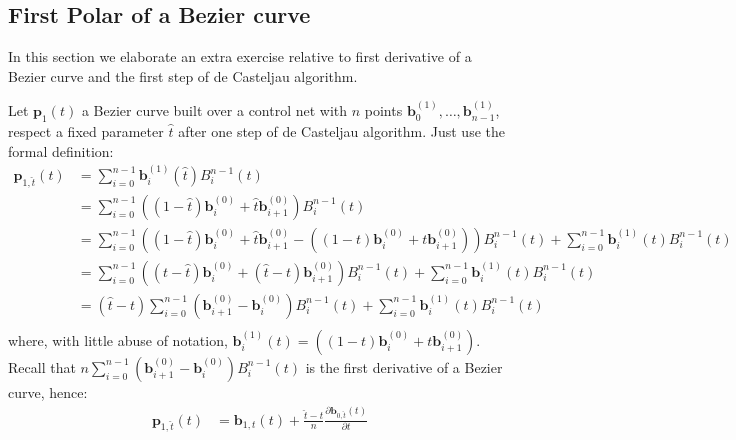 \documentclass{article}
\begin{document}
\newpage

\subsection{First Polar of a Bezier curve}

In this section we elaborate an extra exercise relative to first derivative
of a Bezier curve and the first step of de Casteljau algorithm.

Let $\mathbf{p}_{1}(t)$ a Bezier curve built over a control net with $n$ points
$\mathbf{b}_{0}^{(1)},\ldots,\mathbf{b}_{n-1}^{(1)}$, respect a fixed parameter $\hat{t}$
after one step of de Casteljau algorithm. Just use the formal definition:
\begin{displaymath}
    \begin{split}
        \mathbf{p}_{1,\hat{t}}(t)  &= \sum_{i=0}^{n-1}{\mathbf{b}_{i}^{(1)}(\hat{t})B_{i}^{n-1}(t)} \\
            &=  \sum_{i=0}^{n-1}{\left( (1-\hat{t})\mathbf{b}_{i}^{(0)} +
                \hat{t}\mathbf{b}_{i+1}^{(0)}\right)B_{i}^{n-1}(t)} \\
            &=  \sum_{i=0}^{n-1}{\left( (1-\hat{t})\mathbf{b}_{i}^{(0)} +
                \hat{t}\mathbf{b}_{i+1}^{(0)} -\left( (1-t)\mathbf{b}_{i}^{(0)} +
                t\mathbf{b}_{i+1}^{(0)}\right)\right)B_{i}^{n-1}(t)} +
                \sum_{i=0}^{n-1}{\mathbf{b}_{i}^{(1)}(t)B_{i}^{n-1}(t)} \\
            &=  \sum_{i=0}^{n-1}{\left( (t-\hat{t})\mathbf{b}_{i}^{(0)} +
                (\hat{t}-t)\mathbf{b}_{i+1}^{(0)}\right)B_{i}^{n-1}(t)} +
                \sum_{i=0}^{n-1}{\mathbf{b}_{i}^{(1)}(t)B_{i}^{n-1}(t)} \\
            &=  (\hat{t}-t)\sum_{i=0}^{n-1}{\left(
                \mathbf{b}_{i+1}^{(0)} - \mathbf{b}_{i}^{(0)}\right)B_{i}^{n-1}(t)} +
                \sum_{i=0}^{n-1}{\mathbf{b}_{i}^{(1)}(t)B_{i}^{n-1}(t)} \\
    \end{split}
\end{displaymath}
where, with little abuse of notation, $\mathbf{b}_{i}^{(1)}(t) =
\left( (1-t)\mathbf{b}_{i}^{(0)} + t\mathbf{b}_{i+1}^{(0)}\right)$.
Recall that $n\sum_{i=0}^{n-1}{\left(
\mathbf{b}_{i+1}^{(0)} - \mathbf{b}_{i}^{(0)}\right)B_{i}^{n-1}(t)}$ is the
first derivative of a Bezier curve, hence:
\begin{displaymath}
    \begin{split}
        \mathbf{p}_{1, \hat{t}}(t)  &= \mathbf{b}_{1, t}(t) +
        \frac{\hat{t}-t}{n}\frac{\partial \mathbf{b}_{0, \hat{t}}(t) }{\partial t}
    \end{split}
\end{displaymath}
\end{document}
